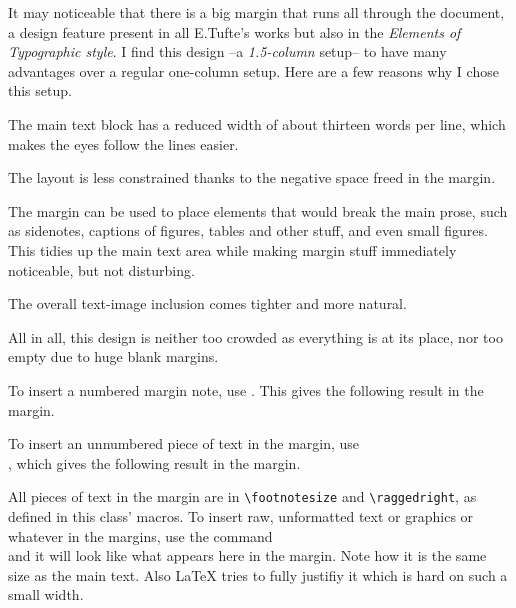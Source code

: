 \documentclass[raggedright, twoside, 11pt]{tufte-style-article}
\begin{document}
It may noticeable that there is a big margin that runs all through the document, a design feature present in all E.Tufte's works but also in the \textit{Elements of Typographic style}. I find this design --a \textit{1.5-column} setup-- to have many advantages over a regular one-column setup. Here are a few reasons why I chose this setup.
\begin{ul}
	\tightlist
	\item The main text block has a reduced width of about thirteen words per line, which makes the eyes follow the lines easier.
	
	\item The layout is less constrained thanks to the negative space freed in the margin.
	
	\item The margin can be used to place elements that would break the main prose, such as sidenotes, captions of figures, tables and other stuff, and even small figures. This tidies up the main text area while making margin stuff immediately noticeable, but not disturbing.
	
	\item The overall text-image inclusion comes tighter and more natural.
\end{ul}
All in all, this design is neither too crowded as everything is at its place, nor too empty due to huge blank margins.

To insert a numbered margin note, use . This gives the following result in the margin.

To insert an unnumbered piece of text in the margin, use\\\noindent{}, which gives the following result in the margin.

All pieces of text in the margin are in \texttt{\textbackslash footnotesize} and \texttt{\textbackslash raggedright}, as defined in this class' macros. To insert raw, unformatted text or graphics or whatever in the margins, use the command\\  and it will look like what appears here in the margin. Note how it is the same size as the main text. Also \LaTeX{} tries to fully justifiy it which is hard on such a small width.
\end{document}
